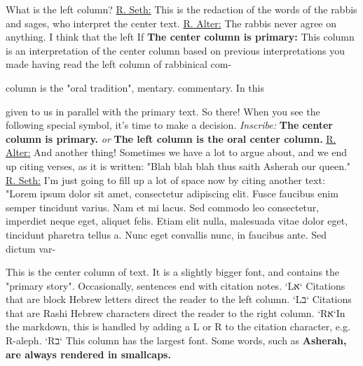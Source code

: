 \documentclass[11pt,letterpaper,openany]{scrbook}
\newcommand{\leftcitation}[1]{\leftcitationfont{\Large\textcolor{hcolor}{#1}}}
\newcommand{\rightcitation}[1]{\rightcitationfont{\normalsize\textcolor{hcolor}{#1}}}
\begin{document}
\begin{sloppypar}
\begin{paracol}{2}

\fontsize{11}{13}\leftfont  \leftcitation{א} \leftfont What is the left column? \underline{R. Seth:} This is the redaction of the words of the rabbis and sages, who interpret the center text. \underline{R. Alter:} The rabbis never agree on anything. I think that the left \switchcolumn\fontsize{11}{13}\rightfont  \rightcitation{א} \rightfont If \textbf{The center column is primary:}  This column is an interpretation of the center column based on previous interpretations you made having read the left column of rabbinical com- 

\end{paracol}


\begin{paracol}{3}

\fontsize{11}{13}\leftfont column is the "oral tradition", \switchcolumn[2]\fontsize{11}{13}\rightfont mentary. commentary. In this 

\end{paracol}

\begin{paracol}{3}\fontsize{11}{13}\leftfont given to us in parallel with the primary text. So there! When you see the following special symbol, it's time to make a decision.  \leftfont \textit{Inscribe:} \textbf{The center column is primary.} \textit{or} \textbf{The left column is the oral center column.}  \leftcitation{ב} \leftfont \underline{R. Alter:}  And another thing! Sometimes we have a lot to argue about, and we end up citing verses, as it is written: "Blah blah blah thus saith Asherah our queen." \underline{R. Seth:} I'm just going to fill up a lot of space now by citing another text: "Lorem ipsum dolor sit amet, consectetur adipiscing elit. Fusce faucibus enim semper tincidunt varius. Nam et mi lacus. Sed commodo leo consectetur, imperdiet neque eget, aliquet felis. Etiam elit nulla, malesuada vitae dolor eget, tincidunt pharetra tellus a. Nunc eget convallis nunc, in faucibus ante. Sed dictum var- 

\switchcolumn

\fontsize{13}{15}\centerfont This is the center column of text. It is a slightly bigger font, and contains the "primary story". Occasionally, sentences end with citation notes. `Lא` Citations that are block Hebrew letters direct the reader to the left column. `Lב` Citations that are Rashi Hebrew characters direct the reader to the right column. `Rא`In the markdown, this is handled by adding a L or R to the citation character, e.g. R-aleph. `Rב` This column has the largest font. Some words, such as \textbf{Asherah, are always rendered in smallcaps. }


\end{paracol}
\end{sloppypar}
\end{document}

